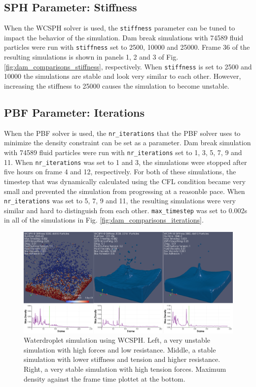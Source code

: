\documentclass[11pt, letterpaper, twocolumn]{article}
\begin{document}
\subsection{SPH Parameter: Stiffness}
\label{subsec:sph_param_stiffness}
When the WCSPH solver is used, the \texttt{stiffness} parameter can be tuned to impact the behavior of the simulation. Dam break simulations with 74589 fluid particles were run with \texttt{stiffness} set to 2500, 10000 and 25000. Frame 36 of the resulting simulations is shown in panels 1, 2 and 3 of Fig. \ref{fig:dam_comparisons_stiffness}, respectively. When \texttt{stiffness} is set to 2500 and 10000
the simulations are stable and look very similar to each other. However, increasing the stiffness to 25000 causes the simulation to become unstable.

\subsection{PBF Parameter: Iterations}
\label{subsec:pbf_param_iterations}
When the PBF solver is used, the \texttt{nr\_iterations} that the PBF solver uses to minimize the density constraint can be set as a parameter. Dam break simulation with 74589 fluid particles were run with \texttt{nr\_iterations} set to 1, 3, 5, 7, 9 and 11. When \texttt{nr\_iterations} was set to 1 and 3, the simulations were stopped after five hours on frame 4 and 12, respectively. For both of these
simulations, the timestep that was dynamically calculated using the CFL condition became very small and prevented the simulation from progressing at a reasonble pace. When \texttt{nr\_iterations} was set to 5, 7, 9 and 11, the resulting simulations were very similar and hard to distinguish from each other. \texttt{max\_timestep} was set to 0.002s in all of the simulations in Fig. \ref{fig:dam_comparisons_iterations}.

\begin{figure}[!b]
  \centering
  \includegraphics[width=\textwidth]{images/convergence_sph.png}
  \caption{Waterdroplet simulation using WCSPH. Left, a very unstable simulation with high forces and low resistance. Middle, a stable simulation with lower stiffness and tension and higher resistance. Right, a very stable simulation with high tension forces. Maximum density against the frame time plottet at the bottom.}
  \label{fig:convergence_sph}
\end{figure}
\end{document}
